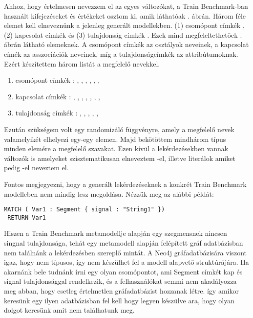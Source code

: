 Ahhoz, hogy értelmesen nevezzem el az egyes változókat, a Train Benchmark-ban használt kifejezéseket és értékeket osztom ki, amik láthatóak . ábrán. Három féle elemet kell elneveznünk a jelenleg generált modellekben. (1) csomópont címkék  , (2) kapcsolat címkék  és (3) tulajdonság címkék .
Ezek mind megfeleltethetőek . ábrán látható elemeknek. A csomópont címkék az osztályok neveinek, a kapcsolat címék az asszociációk neveinek, míg a tulajdonságcímkék az attribútumoknak. Ezért készítettem három listát a megfelelő nevekkel.
\begin{enumerate}
	\item csomópont címkék : , , , , , , 
	\item kapcsolat címkék : , , , , , , , 
	\item tulajdonság címkék : , , , , , 
	
\end{enumerate}
Ezután szükségem volt egy randomizáló függvényre, amely a megfelelő nevek valamelyikét elhelyezi egy-egy elemen.
Majd bekötöttem mindhárom típus minden elemére a megfelelő szavakat. Ezen kívül a lekérdezésekben vannak változók is amelyeket szisztematikusan elneveztem -el, illetve literálok amiket pedig -el neveztem el. 

Fontos megjegyezni, hogy a generált lekérdezéseknek a konkrét Train Benchmark modelleben nem mindig lesz megoldása. Nézzük meg az alábbi példát:
 \begin{lstlisting}[style=cyphersmall]
 MATCH ( Var1 : Segment { signal : "String1" })
 RETURN Var1 \end{lstlisting}
 \noindent Hiszen a Train Benchmark metamodellje alapján egy szegmensnek nincsen singnal tulajdonsága, tehát egy metamodell alapján felépített gráf adatbázisban nem találnánk a lekérdezésben szereplő mintát. A Neo4j gráfadatbázisára viszont igaz, hogy nem típusos, így nem készülhet fel a modell alapvető struktúrájára. Ha akarnánk bele tudnánk írni egy olyan csomópontot, ami Segment címkét kap és signal tulajdonsággal rendelkezik, és a felhasználókat semmi nem akadályozza meg abban, hogy esetleg értelmetlen gráfadatbázist hozzanak létre. így amikor keresünk egy ilyen adatbázisban fel kell hogy legyen készülve ara, hogy olyan dolgot keresünk amit nem találhatunk meg. 

